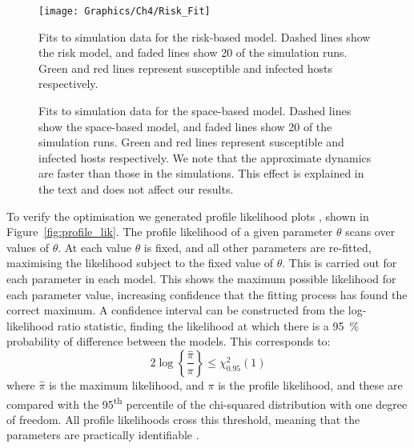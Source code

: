 \begin{figure}
    \begin{center}
        \texttt{[image: Graphics/Ch4/Risk\_Fit]}
        \caption[Risk-based approximate model fitted to the network model]{Fits to simulation data for the risk-based model. Dashed lines show the risk model, and faded lines show 20 of the simulation runs. Green and red lines represent susceptible and infected hosts respectively.}
        \label{fig:risk_fit}
    \end{center}
\end{figure}

\begin{figure}[h]
    \begin{center}
        \caption[Space-based approximate model fitted to the network model]{Fits to simulation data for the space-based model. Dashed lines show the space-based model, and faded lines show 20 of the simulation runs. Green and red lines represent susceptible and infected hosts respectively. We note that the approximate dynamics are faster than those in the simulations. This effect is explained in the text and does not affect our results.\label{fig:space_fit}}
    \end{center}
\end{figure}

To verify the optimisation we generated profile likelihood plots \citep{bolker_ecological_2008}, shown in Figure~\ref{fig:profile_lik}. The profile likelihood of a given parameter $\theta$ scans over values of $\theta$. At each value $\theta$ is fixed, and all other parameters are re-fitted, maximising the likelihood subject to the fixed value of $\theta$. This is carried out for each parameter in each model. This shows the maximum possible likelihood for each parameter value, increasing confidence that the fitting process has found the correct maximum. A confidence interval can be constructed from the log-likelihood ratio statistic, finding the likelihood at which there is a \SI{95}{\percent} probability of difference between the models. This corresponds to:
\begin{equation}
    2\log\left\{\frac{\hat{\pi}}{\pi}\right\} \leq \chi^2_{0.95}(1)
\end{equation}
where $\hat{\pi}$ is the maximum likelihood, and $\pi$ is the profile likelihood, and these are compared with the 95\textsuperscript{th} percentile of the chi-squared distribution with one degree of freedom. All profile likelihoods cross this threshold, meaning that the parameters are practically identifiable \citep{raue_structural_2009}.

